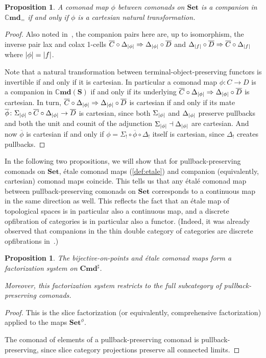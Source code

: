 \documentclass[11pt, oneside, article]{memoir}
\theoremstyle{plain}
\newtheorem{proposition}[theorem]{Proposition}
\theoremstyle{definition}
\theoremstyle{remark}
\DeclarePairedDelimiter{\abs}{\lvert}{\rvert}
\newcommand{\bang}{\mathrm{!}}
\newcommand{\namedcat}[1]{\mathbf{#1}}
\newcommand{\cat}[1]{\mathbf{#1}}
\newcommand{\Set}{\namedcat{Set}}
\newcommand{\Cmd}{\mathbb{C}\namedcat{md}}
\newcommand{\CmdId}{\Cmd_=}
\newcommand{\CmdIdSet}{\CmdId}
\newcommand{\Com}{\namedcat{Cmd}^\sharp}
\newcommand{\ComSet}{\Com}
\newcommand{\clift}[1]{\overline{#1}}
\newcommand{\pts}[1]{{\abs{#1}}}
\newcommand{\one}[1]{\pts{#1}}
\newcommand{\leindex}[1]{\Sigma_{#1}}
\newcommand{\reindex}[1]{\Delta_{#1}}
\newcommand{\slicel}{\Sigma_\bang}
\newcommand{\slicer}{\Delta_\bang}
\newcommand{\com}[2]{{#1}^{#2}}
\newcommand{\cmnd}[1]{{#1}}
\newcommand{\cC}{\cmnd{C}}
\newcommand{\cD}{\cmnd{D}}
\newcommand{\bS}{\cat{S}}
\newcommand{\slice}{slice}
\begin{document}
\begin{proposition}\label{prop:companion}
  A comonad map $\phi$ between comonads on $\Set$ is a companion in
  $\CmdIdSet$ if and only if $\phi$ is a cartesian natural
  transformation.
\end{proposition}
\begin{proof}
  Also noted in~\cite[Remark A.9]{fairbanks-shulman}, the companion
  pairs here are, up to isomorphism, the inverse pair lax and colax
  1-cells
  $\clift{\cC} \circ \reindex{\one{\phi}} \Rightarrow
  \reindex{\one{\phi}} \circ \clift{\cD}$ and
  $\reindex{\one{f}} \circ \clift{\cD} \Rightarrow \clift{\cC} \circ
  \reindex{\one{f}}$ where $\one{\phi} = \one{f}$.

  Note that a natural transformation between
  terminal-object-preserving functors is invertible if and only if it
  is cartesian. In particular a comonad map $\phi \colon \cC \to \cD$
  is a companion in $\Cmd(\bS)$ if and only if its underlying
  $\clift{\cC} \circ \reindex{\one{\phi}} \Rightarrow
  \reindex{\one{\phi}} \circ \clift{\cD}$ is cartesian. In turn,
  $\clift{\cC} \circ \reindex{\one{\phi}} \Rightarrow
  \reindex{\one{\phi}} \circ \clift{\cD}$ is cartesian if and only if
  its mate
  $\clift{\phi} \colon \leindex{\one{\phi}} \circ \clift{\cC} \circ
  \reindex{\one{\phi}} \to \clift{\cD}$ is cartesian, since both
  $\leindex{\one{\phi}}$ and $\reindex{\one{\phi}}$ preserve pullbacks
  and both the unit and counit of the adjunction
  $\leindex{\one{\phi}} \dashv \reindex{\one{\phi}}$ are cartesian. And
  now $\clift{\phi}$ is cartesian if and only if
  $\phi = \slicel \circ \clift{\phi} \circ \slicer$ itself is cartesian,
  since $\slicer$ creates pullbacks.
\end{proof}

In the following two propositions, we will show that for
pullback-preserving comonads on $\Set$, \'etale comonad maps
(\cref{def:etale}) and companion (equivalently, cartesian) comonad
maps coincide. This tells us that any \'etal\'e comonad map between
pullback-preserving comonads on $\Set$ corresponds to a continuous map
in the same direction as well. This reflects the fact that an \'etale
map of topological spaces is in particular also a continuous map, and
a discrete opfibration of categories is in particular also a
functor. (Indeed, it was already observed that companions in the thin
double category of categories are discrete opfibrations
in~\cite{clarke}.)

\begin{proposition}\label{prop:booetale}
  The bijective-on-points and \'etale comonad maps form a
  factorization system on $\ComSet$.

  Moreover, this factorization system restricts to the full
  subcategory of pullback-preserving comonads.
\end{proposition}
\begin{proof}
  This is the {\slice} factorization (or equivalently, comprehensive
  factorization) applied to the maps $\com{\Set}{\phi}$.

  The comonad of elements of a pullback-preserving comonad is
  pullback-preserving, since slice category projections preserve
  all connected limits.
\end{proof}
\end{document}
